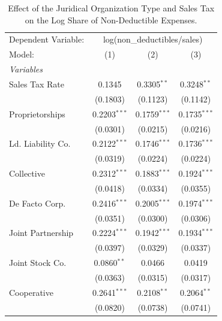 \documentclass[
  12pt]{article}
\theoremstyle{definition}
\theoremstyle{remark}
\begin{document}
\begin{table}

\caption{\label{tbl-reg-non-ded}Effect of the Juridical Organization
Type and Sales Tax on the Log Share of Non-Deductible Expenses.}

\begin{minipage}{\linewidth}

\begingroup
\centering
\begin{tabular}{lccc}
   \tabularnewline \midrule \midrule
   Dependent Variable: & \multicolumn{3}{c}{log(non\_deductibles/sales)}\\
   Model:            & (1)            & (2)            & (3)\\  
   \midrule
   \emph{Variables}\\
   Sales Tax Rate    & 0.1345         & 0.3305$^{**}$  & 0.3248$^{**}$\\   
                     & (0.1803)       & (0.1123)       & (0.1142)\\   
   Proprietorships   & 0.2203$^{***}$ & 0.1759$^{***}$ & 0.1735$^{***}$\\   
                     & (0.0301)       & (0.0215)       & (0.0216)\\   
   Ld. Liability Co. & 0.2122$^{***}$ & 0.1746$^{***}$ & 0.1736$^{***}$\\   
                     & (0.0319)       & (0.0224)       & (0.0224)\\   
   Collective        & 0.2312$^{***}$ & 0.1883$^{***}$ & 0.1924$^{***}$\\   
                     & (0.0418)       & (0.0334)       & (0.0355)\\   
   De Facto Corp.    & 0.2416$^{***}$ & 0.2005$^{***}$ & 0.1974$^{***}$\\   
                     & (0.0351)       & (0.0300)       & (0.0306)\\   
   Joint Partnership & 0.2224$^{***}$ & 0.1942$^{***}$ & 0.1934$^{***}$\\   
                     & (0.0397)       & (0.0329)       & (0.0337)\\   
   Joint Stock Co.   & 0.0860$^{**}$  & 0.0466         & 0.0419\\   
                     & (0.0363)       & (0.0315)       & (0.0317)\\   
   Cooperative       & 0.2641$^{***}$ & 0.2108$^{**}$  & 0.2064$^{**}$\\   
                     & (0.0820)       & (0.0738)       & (0.0741)\\   

\end{tabular}
\end{minipage}
\end{table}
\end{document}
